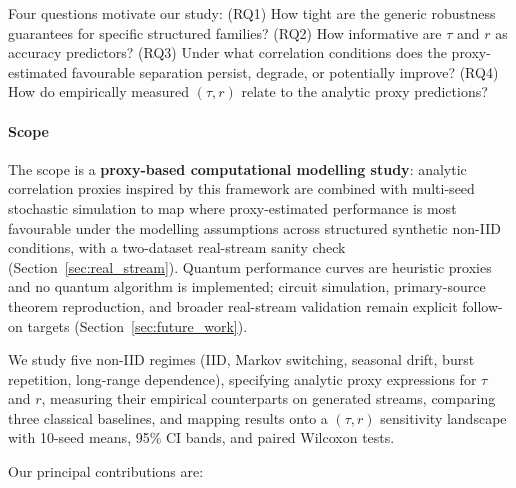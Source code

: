 \documentclass[preprint,12pt,authoryear]{elsarticle}
\begin{document}
Four questions motivate our study: (RQ1) How tight are the generic robustness guarantees for specific structured families? (RQ2) How informative are $\tau$ and $r$ as accuracy predictors? (RQ3) Under what correlation conditions does the proxy-estimated favourable separation persist, degrade, or potentially improve? (RQ4) How do empirically measured $(\tau, r)$ relate to the analytic proxy predictions?

\paragraph{Scope} The scope is a \textbf{proxy-based computational modelling study}: analytic correlation proxies inspired by this framework are combined with multi-seed stochastic simulation to map where proxy-estimated performance is most favourable under the modelling assumptions across structured synthetic non\nobreakdash-IID conditions, with a two\nobreakdash-dataset real-stream sanity check (Section~\ref{sec:real_stream}). Quantum performance curves are heuristic proxies and no quantum algorithm is implemented; circuit simulation, primary-source theorem reproduction, and broader real-stream validation remain explicit follow-on targets (Section~\ref{sec:future_work}).

We study five non\nobreakdash-IID regimes (IID, Markov switching, seasonal drift, burst repetition, long-range dependence), specifying analytic proxy expressions for $\tau$ and $r$, measuring their empirical counterparts on generated streams, comparing three classical baselines, and mapping results onto a $(\tau, r)$ sensitivity landscape with 10-seed means, 95\% CI bands, and paired Wilcoxon tests.

Our principal contributions are:
\end{document}
